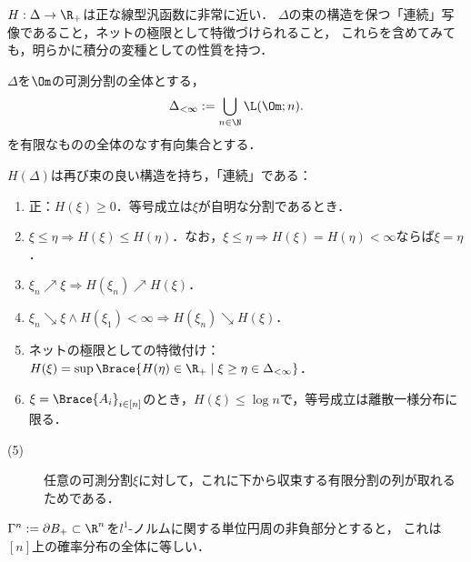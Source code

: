 \documentclass[uplatex,dvipdfmx]{jsreport}
\begin{document}
\begin{tcolorbox}[colframe=ForestGreen, colback=ForestGreen!10!white,breakable,colbacktitle=ForestGreen!40!white,coltitle=black,fonttitle=\bfseries\sffamily,
title=]
    $H:\Delta\to\R_+$は正な線型汎函数に非常に近い．
    $\Delta$の束の構造を保つ「連続」写像であること，ネットの極限として特徴づけられること，
    これらを含めてみても，明らかに積分の変種としての性質を持つ．
\end{tcolorbox}

\begin{notation}
    $\Delta$を$\Om$の可測分割の全体とする，
    \[\Delta_{<\infty}:=\bigcup_{n\in\N}\L(\Om;n).\]
    を有限なものの全体のなす有向集合とする．
\end{notation}

\begin{proposition}[エントロピーの性質]
    $H(\Delta)$は再び束の良い構造を持ち，「連続」である：
    \begin{enumerate}
        \item 正：$H(\xi)\ge0$．等号成立は$\xi$が自明な分割であるとき．
        \item $\xi\le\eta\Rightarrow H(\xi)\le H(\eta)$．なお，$\xi\le\eta\Rightarrow H(\xi)=H(\eta)<\infty$ならば$\xi=\eta$．
        \item $\xi_n\nearrow\xi\Rightarrow H(\xi_n)\nearrow H(\xi)$．
        \item $\xi_n\searrow\xi\land H(\xi_1)<\infty\Rightarrow H(\xi_n)\searrow H(\xi)$．
        \item ネットの極限としての特徴付け：$H(\xi)=\sup\Brace{H(\eta)\in\R_+\mid\xi\ge\eta\in\Delta_{<\infty}}$．
        \item $\xi=\Brace{A_i}_{i\in[n]}$のとき，$H(\xi)\le\log n$で，等号成立は離散一様分布に限る．
    \end{enumerate}
\end{proposition}
\begin{Proof}\mbox{}
    \begin{description}
        \item[(5)] 任意の可測分割$\xi$に対して，これに下から収束する有限分割の列が取れるためである．
    \end{description}
\end{Proof}

\begin{notation}
    $\Gamma^n:=\partial B_+\subset\R^n$を$l^1$-ノルムに関する単位円周の非負部分とすると，
    これは$[n]$上の確率分布の全体に等しい．
\end{notation}
\end{document}
